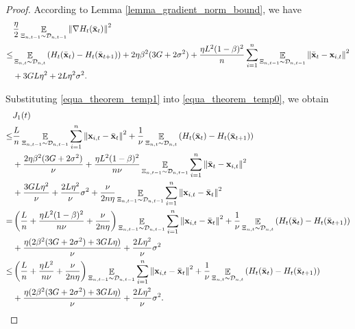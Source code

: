 \documentclass{article}
\begin{document}
\begin{proof}
According to Lemma \ref{lemma_gradient_norm_bound}, we have
\begin{align}
\nonumber
& \frac{\eta}{2}\mathop{\mathbb{E}}_{ \Xi_{n,t-1} \sim \mathcal{D}_{n,t-1} }\left\lVert\nabla H_t(\bar{{\bf x}}_t)\right\rVert^2  \\ \nonumber
\le & \mathop{\mathbb{E}}_{ \Xi_{n,t} \sim \mathcal{D}_{n,t} } \left( H_t(\bar{{\bf x}}_t) - H_t(\bar{{\bf x}}_{t+1}) \right) + 2\eta\beta^2(3G + 2\sigma^2) +  \frac{\eta L^2(1-\beta)^2}{n}\sum_{i=1}^n\mathop{\mathbb{E}}_{ \Xi_{n,t-1} \sim \mathcal{D}_{n,t-1} }\left\lVert\bar{{\bf x}}_t - {\bf x}_{i,t} \right\rVert^2 \\ \label{equa_theorem_temp1}  
& + 3GL\eta^2  + 2L\eta^2 \sigma^2.
\end{align}

Substituting \eqref{equa_theorem_temp1} into \eqref{equa_theorem_temp0}, we obtain
\begin{align}
\nonumber
& J_1(t) \\ \nonumber 
\le & \frac{L}{n}\mathop{\mathbb{E}}_{ \Xi_{n,t-1} \sim \mathcal{D}_{n,t-1} }\sum_{i=1}^n \left\lVert{\bf x}_{i,t} - \bar{{\bf x}}_t\right\rVert^2 +  \frac{1}{\nu} \mathop{\mathbb{E}}_{ \Xi_{n,t} \sim \mathcal{D}_{n,t} } \left( H_t(\bar{{\bf x}}_t) - H_t(\bar{{\bf x}}_{t+1}) \right) \\ \nonumber 
& + \frac{2\eta\beta^2(3G + 2\sigma^2)}{\nu} +  \frac{\eta L^2(1-\beta)^2}{n\nu}\mathop{\mathbb{E}}_{ \Xi_{n,t-1} \sim \mathcal{D}_{n,t-1} }\sum_{i=1}^n\left\lVert\bar{{\bf x}}_t - {\bf x}_{i,t} \right\rVert^2  \\ \nonumber 
&+ \frac{3GL \eta^2}{\nu} + \frac{2L\eta^2}{\nu} \sigma^2  + \frac{\nu}{2n\eta}\mathop{\mathbb{E}}_{ \Xi_{n,t-1} \sim \mathcal{D}_{n,t-1} }\sum_{i=1}^n\left\lVert{\bf x}_{i,t} - \bar{{\bf x}}_t \right\rVert^2  \\ \nonumber
= & \left(  \frac{L}{n} + \frac{\eta L^2(1-\beta)^2}{n\nu} + \frac{\nu}{2n\eta}  \right)\mathop{\mathbb{E}}_{ \Xi_{n,t-1} \sim \mathcal{D}_{n,t-1} }\sum_{i=1}^n\left\lVert{\bf x}_{i,t} - \bar{{\bf x}}_t \right\rVert^2 + \frac{1}{\nu} \mathop{\mathbb{E}}_{ \Xi_{n,t} \sim \mathcal{D}_{n,t} } \left( H_t(\bar{{\bf x}}_t) - H_t(\bar{{\bf x}}_{t+1}) \right) \\ \nonumber 
& + \frac{\eta(2\beta^2(3G + 2\sigma^2) + 3GL \eta)}{\nu}  + \frac{2L\eta^2}{\nu} \sigma^2 \\ \nonumber
\le & \left(  \frac{L}{n} + \frac{\eta L^2}{n\nu} + \frac{\nu}{2n\eta}  \right)\mathop{\mathbb{E}}_{ \Xi_{n,t-1} \sim \mathcal{D}_{n,t-1} }\sum_{i=1}^n\left\lVert{\bf x}_{i,t} - \bar{{\bf x}}_t \right\rVert^2 + \frac{1}{\nu} \mathop{\mathbb{E}}_{ \Xi_{n,t} \sim \mathcal{D}_{n,t} } \left( H_t(\bar{{\bf x}}_t) - H_t(\bar{{\bf x}}_{t+1}) \right) \\ \nonumber 
& + \frac{\eta(2\beta^2(3G + 2\sigma^2) + 3GL \eta)}{\nu}  + \frac{2L\eta^2}{\nu} \sigma^2.
\end{align}


\end{proof}
\end{document}
